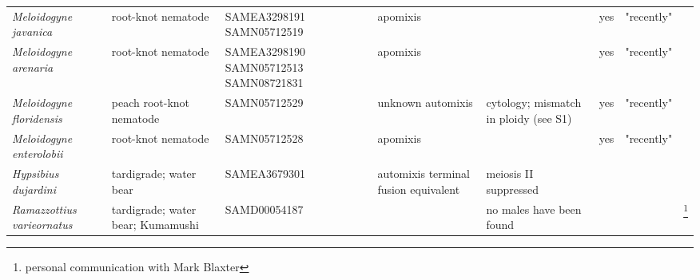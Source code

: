 \documentclass{article}
\begin{document}
\begin{longtable}[H]{ C{.13\textwidth} C{.1\textwidth} C{.12\textwidth} L{.15\textwidth} L{.179\textwidth} C{.04\textwidth} C{.082\textwidth} C{.062\textwidth}}
      \textit{Meloidogyne javanica} & root-knot nematode & SAMEA3298191 SAMN05712519 & apomixis & & yes & "recently" & \cite{Lunt2014} \\
      \textit{Meloidogyne arenaria} & root-knot nematode & SAMEA3298190 SAMN05712513 SAMN08721831 & apomixis & & yes & "recently" & \cite{Lunt2014} \\
      \textit{Meloidogyne floridensis} & peach root-knot nematode & SAMN05712529 & unknown automixis & cytology; mismatch in ploidy (see S1) & yes & "recently" & \cite{Handoo2004, Lunt2014} \\
      \textit{Meloidogyne enterolobii} & root-knot nematode & SAMN05712528 & apomixis & & yes & "recently" & \cite{Lunt2014}\\
      \hline
      \textit{Hypsibius dujardini} & tardigrade; water bear & SAMEA3679301 & automixis terminal fusion equivalent & meiosis II suppressed & & & \cite{Ammermann1967} \\
      \textit{Ramazzottius varieornatus} & tardigrade; water bear; Kumamushi & SAMD00054187 & & no males have been found & & & \footnote{personal communication with Mark Blaxter} \\

    \end{longtable}

  \clearpage
  \newpage

  
  {}
\end{document}

